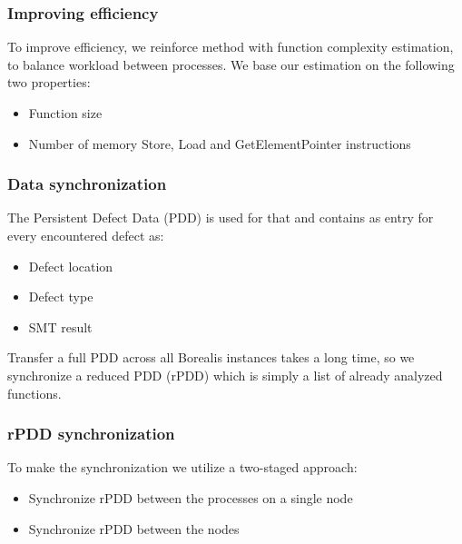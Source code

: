 
\begin{frame}
\frametitle{Improving efficiency}
To improve efficiency, we reinforce method with function complexity estimation, to balance workload between processes. We base our estimation on the following two properties:
	\begin{itemize}
		\item Function size
		\item Number of memory Store, Load and GetElementPointer instructions
	\end{itemize}
\end{frame}


\begin{frame}
\frametitle{Data synchronization}
The Persistent Defect Data (PDD) is used for that and contains as entry for every encountered defect as:
	\begin{itemize}
		\item Defect location
		\item Defect type
		\item SMT result
	\end{itemize}
\begin{block}
	\centering
	Transfer a full PDD across all Borealis instances takes a long time, so we synchronize a reduced PDD (rPDD) which is simply a list of already analyzed functions.
\end{block}
\end{frame}


\begin{frame}
\frametitle{rPDD synchronization}
To make the synchronization we utilize a two-staged approach:
	\begin{itemize}
		\item Synchronize rPDD between the processes on a single node
		\item Synchronize rPDD between the nodes
\end{itemize}
\end{frame}

